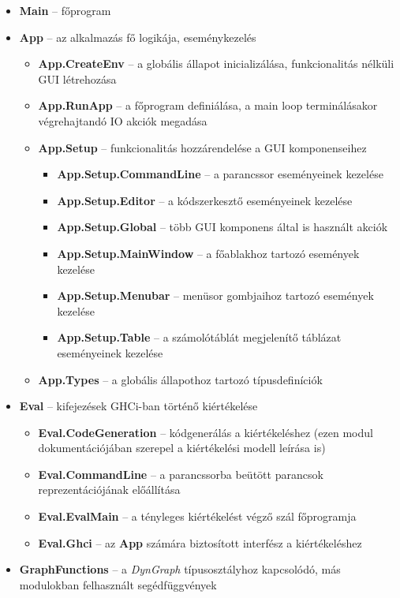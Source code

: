 \begin{itemize}
	\item \textbf{Main} -- főprogram
	\item \textbf{App} -- az alkalmazás fő logikája, eseménykezelés
	\begin{itemize}
		\item \textbf{App.CreateEnv} -- a globális állapot inicializálása, funkcionalitás nélküli GUI létrehozása
		\item \textbf{App.RunApp} -- a főprogram definiálása, a main loop terminálásakor végrehajtandó IO akciók megadása
		\item \textbf{App.Setup}	-- funkcionalitás hozzárendelése a GUI komponenseihez
		\begin{itemize}
			\item \textbf{App.Setup.CommandLine} -- a parancssor eseményeinek kezelése
			\item \textbf{App.Setup.Editor} -- a kódszerkesztő eseményeinek kezelése
			\item \textbf{App.Setup.Global} -- több GUI komponens által is használt akciók
			\item \textbf{App.Setup.MainWindow} -- a főablakhoz tartozó események kezelése
			\item \textbf{App.Setup.Menubar} -- menüsor gombjaihoz tartozó események kezelése
			\item \textbf{App.Setup.Table} -- a számolótáblát megjelenítő táblázat eseményeinek kezelése
		\end{itemize}
		\item \textbf{App.Types} -- a globális állapothoz tartozó típusdefiníciók
	\end{itemize}
	\item \textbf{Eval} -- kifejezések GHCi-ban történő kiértékelése
	\begin{itemize}
		\item \textbf{Eval.CodeGeneration} -- kódgenerálás a kiértékeléshez (ezen modul dokumentációjában szerepel a kiértékelési modell leírása is)
		\item \textbf{Eval.CommandLine} -- a parancssorba beütött parancsok reprezentációjának előállítása
		\item \textbf{Eval.EvalMain} -- a tényleges kiértékelést végző szál főprogramja
		\item \textbf{Eval.Ghci} -- az \textbf{App} számára biztosított interfész a kiértékeléshez
	\end{itemize}
	\item \textbf{GraphFunctions} -- a \textit{DynGraph} típusosztályhoz kapcsolódó, más modulokban felhasznált segédfüggvények 	

\end{itemize}
